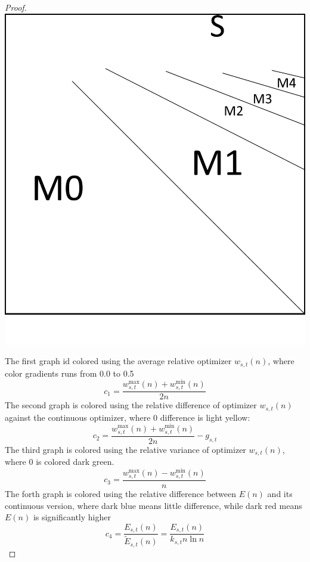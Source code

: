 \documentclass[]{article}
\begin{document}
\begin{proof}
	\vspace{0.3cm}
	
	\includegraphics[scale=0.3]{mode.png}
	
	The first graph id colored using the average relative optimizer $w_{s,t}(n)$, where color gradients runs from 0.0 to 0.5
	\[
	c_1 = \frac{w^{\max}_{s,t}(n) + w^{\min}_{s,t}(n)}{2n}
	\]
	The second graph is colored using the relative difference of optimizer $w_{s,t}(n)$ against the continuous optimizer, where 0 difference is light yellow:
	\[
	c_2 = \frac{w^{\max}_{s,t}(n) + w^{\min}_{s,t}(n)}{2n} - g_{s,t}
	\]  
	The third graph is colored using the relative variance of optimizer $w_{s,t}(n)$, where 0 is colored dark green.
	\[
	c_3 = \frac{w^{\max}_{s,t}(n) - w^{\min}_{s,t}(n)}{n}
	\]
	The forth graph is colored using the relative difference between $E(n)$ and its continuous version, where dark blue means little difference, while dark red means $E(n)$ is significantly higher
	\[
	c_4 =\frac{E_{s,t}(n)} {\tilde{E}_{s,t}(n)} = \frac{E_{s,t}(n)} {k_{s,t} n \ln n}
	\]
	

\end{proof}
\end{document}
